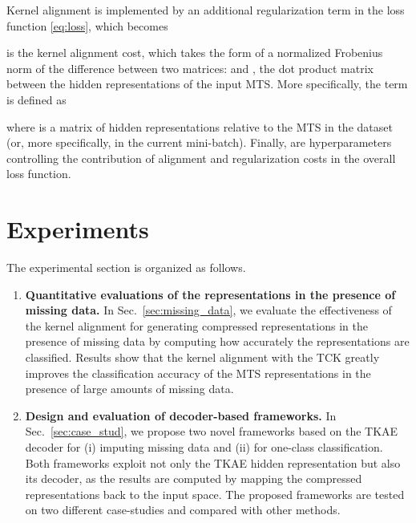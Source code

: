 \documentclass[a4paper,10pt,pdftex]{article}
\begin{document}
Kernel alignment is implemented by an additional regularization term in the loss function \eqref{eq:loss}, which becomes

 is the kernel alignment cost, which takes the form of a normalized Frobenius norm of the difference between two matrices:  and , the dot product matrix between the hidden representations  of the input MTS.
More specifically, the  term is defined as

where  is a matrix of hidden representations relative to the  MTS in the dataset (or, more specifically, in the current mini-batch).
Finally,  are hyperparameters controlling the contribution of alignment and regularization costs in the overall loss function.


\section{Experiments}
\label{sec:experiments}

The experimental section is organized as follows.

\begin{enumerate}
    \item \textbf{Quantitative evaluations of the representations in the presence of missing data.} In Sec.~\ref{sec:missing_data}, we evaluate the effectiveness of the kernel alignment for generating compressed representations in the presence of missing data by computing how accurately the representations are classified.
    Results show that the kernel alignment with the TCK greatly improves the classification accuracy of the MTS representations in the presence of large amounts of missing data.
    \item \textbf{Design and evaluation of decoder-based frameworks.} In Sec.~\ref{sec:case_stud}, we propose two novel frameworks based on the TKAE decoder for (i) imputing missing data and (ii) for one-class classification. 
    Both frameworks exploit not only the TKAE hidden representation but also its decoder, as the results are computed by mapping the compressed representations back to the input space.
    The proposed frameworks are tested on two different case-studies and compared with other methods.
\end{enumerate}
\end{document}
